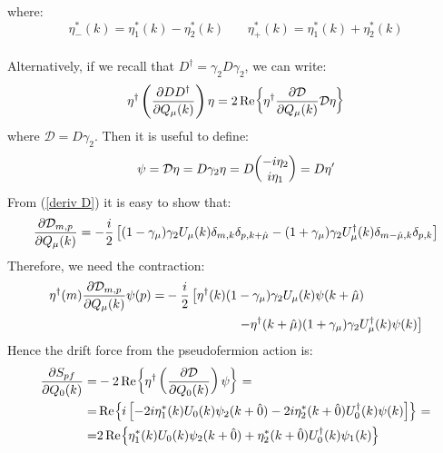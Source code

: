 where:
\begin{equation*}
    \eta_-^*(k) = \eta_1^* (k) - \eta_2^* (k) \,\,\,\,\,\,\,\,\,\,\, \eta_+^*(k) = \eta_1^* (k) + \eta_2^* (k)
\end{equation*}
\vspace{5mm}
\\Alternatively, if we recall that $D^\dagger = \gamma_2 D \gamma_2$, we can write:
\begin{equation*}
    \eta^\dagger \left(\pdv{D D^\dagger}{Q_\mu(k)}\right) \eta = 2 \Re{\eta^\dagger \pdv{\mathcal{D}}{Q_\mu(k)} \mathcal{D}\eta}
\end{equation*}
where $\mathcal{D} = D\gamma_2$. Then it is useful to define:
\begin{equation}
    \psi = \mathcal{D}\eta = D \gamma_2 \eta = D \mqty(-i \eta_2 \\ i \eta_1) = D \eta'
\end{equation}
From (\ref{deriv D}) it is easy to show that:
\begin{equation}\label{deriv Dcal}
    \pdv{\mathcal{D}_{m,p}}{Q_\mu(k)} = - \frac{i}{2} \left[ (1 - \gamma_\mu) \gamma_2 U_\mu(k) \delta_{m,k} \delta_{p, k + \hat{\mu}} - (1 + \gamma_\mu) \gamma_2 U_\mu^\dagger(k)\delta_{m - \hat{\mu}, k} \delta_{p, k}  \right]
\end{equation}
Therefore, we need the contraction:
\begin{equation}
\begin{split}
        \eta^\dagger (m) \pdv{\mathcal{D}_{m,p}}{Q_\mu(k)} \psi(p) =& - \frac{i}{2} \left[\eta^\dagger(k) (1 - \gamma_\mu) \gamma_2 U_\mu(k) \psi(k + \hat{\mu}) \right. \\ & \left. \hspace{20mm} - \eta^\dagger(k + \hat{\mu}) (1 + \gamma_\mu) \gamma_2 U_\mu^\dagger(k) \psi(k)  \right]
\end{split}
\end{equation}
Hence the drift force from the pseudofermion action is:
\begin{equation}
    \begin{split}
        \pdv{S_{pf}}{Q_0(k)} = & - 2 \Re{\eta^\dagger \left( \pdv{\mathcal{D}}{Q_0(k)} \right) \psi} = \\
        = & \Re{i\left[ -2i \eta^*_1(k) U_0(k) \psi_2(k + \hat{0}) - 2i \eta^*_2(k + \hat{0}) U_0^\dagger(k)\psi(k) \right]} = \\
        = & 2 \Re{\eta^*_1(k) U_0(k) \psi_2(k + \hat{0}) + \eta^*_2(k + \hat{0}) U_0^\dagger(k) \psi_1(k)}
    \end{split}
\end{equation}
